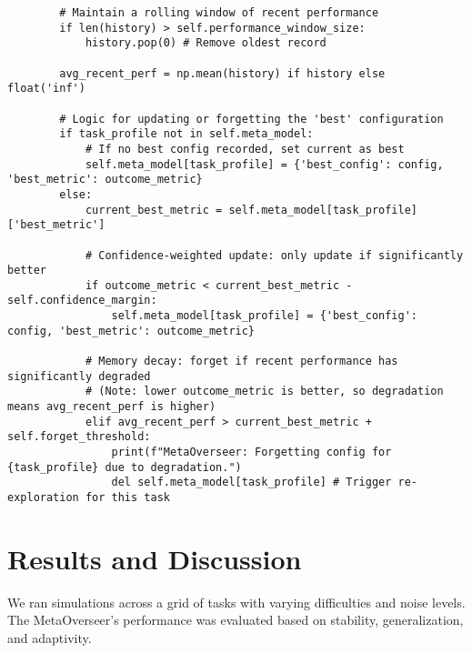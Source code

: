 \documentclass{article}
\begin{document}
\begin{verbatim}
        # Maintain a rolling window of recent performance
        if len(history) > self.performance_window_size:
            history.pop(0) # Remove oldest record

        avg_recent_perf = np.mean(history) if history else float('inf')

        # Logic for updating or forgetting the 'best' configuration
        if task_profile not in self.meta_model:
            # If no best config recorded, set current as best
            self.meta_model[task_profile] = {'best_config': config, 'best_metric': outcome_metric}
        else:
            current_best_metric = self.meta_model[task_profile]['best_metric']
            
            # Confidence-weighted update: only update if significantly better
            if outcome_metric < current_best_metric - self.confidence_margin:
                self.meta_model[task_profile] = {'best_config': config, 'best_metric': outcome_metric}
            
            # Memory decay: forget if recent performance has significantly degraded
            # (Note: lower outcome_metric is better, so degradation means avg_recent_perf is higher)
            elif avg_recent_perf > current_best_metric + self.forget_threshold:
                print(f"MetaOverseer: Forgetting config for {task_profile} due to degradation.")
                del self.meta_model[task_profile] # Trigger re-exploration for this task
\end{verbatim}

\section{Results and Discussion}
We ran simulations across a grid of tasks with varying difficulties and noise levels. The MetaOverseer's performance was evaluated based on stability, generalization, and adaptivity.
\end{document}
